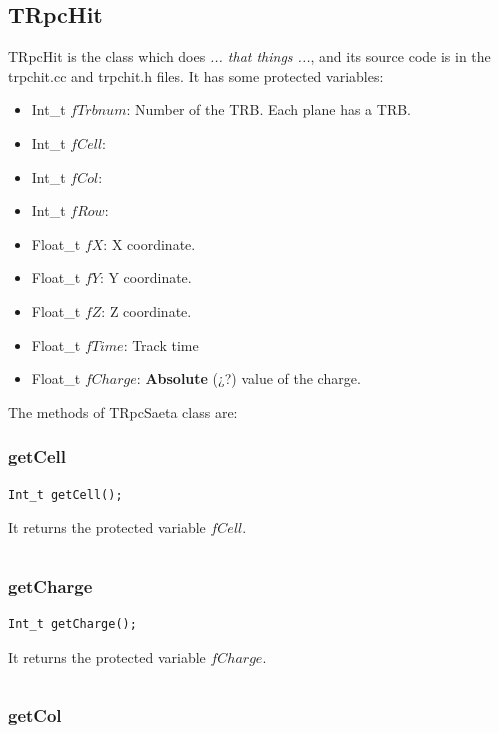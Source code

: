 \documentclass[a4paper]{book}
\begin{document}
\subsection{TRpcHit}

TRpcHit is the class which does \textit{... that things ...}, and its source code is in the trpchit.cc and trpchit.h files. It has some protected variables:

\begin{itemize}
    \item Int\_t $fTrbnum$: Number of the TRB. Each plane has a TRB.
    \item Int\_t $fCell$: 
    \item Int\_t $fCol$: 
    \item Int\_t $fRow$: 
    \item Float\_t $fX$: X coordinate.
    \item Float\_t $fY$: Y coordinate.
    \item Float\_t $fZ$: Z coordinate.
    \item Float\_t $fTime$: Track time
    \item Float\_t $fCharge$: \textbf{Absolute} (¿?) value of the charge.
\end{itemize}

The methods of TRpcSaeta class are:

\subsubsection{getCell}

\begin{lstlisting}
Int_t getCell();
\end{lstlisting}

It returns the protected variable $fCell$.

\[\]

\subsubsection{getCharge}

\begin{lstlisting}
Int_t getCharge();
\end{lstlisting}

It returns the protected variable $fCharge$.

\[\]

\subsubsection{getCol}
\end{document}
